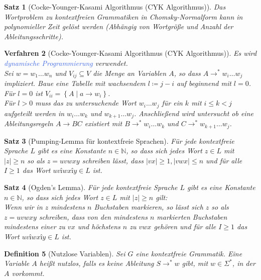 \documentclass[11pt]{article}
\newcommand{\tcol}[1]{\textcolor{RoyalBlue}{#1}}
\newcommand{\set}[1]{\left\lbrace #1\right\rbrace}
\theoremstyle{break}
\newtheorem{satz}{Satz}[section]
\newtheorem{defi}[satz]{Definition}
\newtheorem{verf}[satz]{Verfahren}
\begin{document}
    \begin{satz}[Cocke-Younger-Kasami Algorithmus (CYK Algorithmus)]
        Das Wortproblem zu kontextfreien Grammatiken in Chomsky-Normalform kann in polynomieller Zeit gelöst werden (Abhängig von Wortgröße und Anzahl der Ableitungsschritte).
    \end{satz}

    \begin{verf}[Cocke-Younger-Kasami Algorithmus (CYK Algorithmus)]
        Es wird \tcol{dynamische Programmierung} verwendet.\\
        Sei $w=w_1\dots w_n$ und $V_{ij}\subseteq V$ die Menge an Variablen $A$, so dass $A\rightarrow^*w_i\dots w_j$ impliziert.
        Baue eine Tabelle mit wachsendem $l\coloneqq j-i$ auf beginnend mit $l=0$.\\
        Für $l=0$ ist $V_{ii}=\set{A\mid a\rightarrow w_i}$.\\
        Für $l>0$ muss das zu untersuchende Wort $w_i\dots w_j$ für ein $k$ mit $i\leq k<j$ aufgeteilt werden in $w_i\dots w_k$ und $w_{k+1}\dots w_j$.
        Anschließend wird untersucht ob eine Ableitungsregeln $A\rightarrow BC$ existiert mit $B\rightarrow^* w_i\dots w_k$ und $C\rightarrow^* w_{k+1}\dots w_j$.
    \end{verf}

    \begin{satz}[Pumping-Lemma für kontextfreie Sprachen]
        Für jede kontextfreie Sprache $L$ gibt es eine Konstante $n\in\mathbb{N}$, so dass sich jedes Wort $z\in L$ mit $|z|\geq n$ so als $z=uvwxy$ schreiben lässt, dass $|vx|\geq 1,|vwx|\leq n$ und für alle $I\geq 1$ das Wort $uvîwxîy\in L$ ist.
    \end{satz}

    \begin{satz}[Ogden's Lemma]
        Für jede kontextfreie Sprache $L$ gibt es eine Konstante $n\in\mathbb{N}$, so dass sich jedes Wort $z\in L$ mit $|z|\geq n$ gilt:\\
        Wenn wir in $z$ mindestens $n$ Buchstaben markieren, so lässt sich $z$ so als $z=uvwxy$ schreiben, dass von den mindestens $n$ markierten Buchstaben mindestens einer zu $vx$ und höchstens $n$ zu $vwx$ gehören und für alle $I\geq 1$ das Wort $uvîwxîy\in L$ ist.
    \end{satz}

    \begin{defi}[Nutzlose Variablen]
        Sei $G$ eine kontextfreie Grammatik.
        Eine Variable $A$ heißt nutzlos, falls es keine Ableitung $S\rightarrow^* w$ gibt, mit $w\in\Sigma^*$, in der $A$ vorkommt.
    \end{defi}
\end{document}
